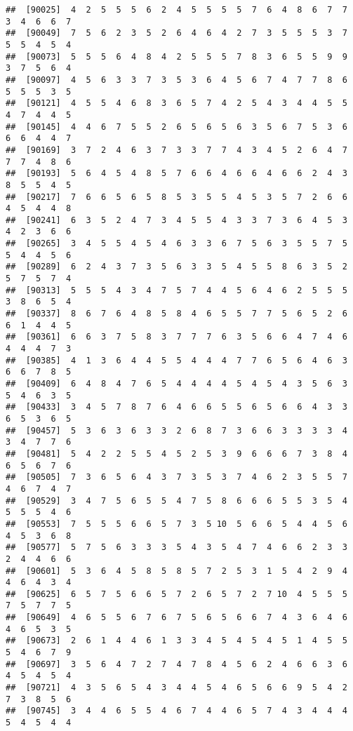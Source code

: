 \documentclass[
]{book}
\begin{document}
\begin{verbatim}
##  [90025]  4  2  5  5  5  6  2  4  5  5  5  5  7  6  4  8  6  7  7  3  4  6  6  7
##  [90049]  7  5  6  2  3  5  2  6  4  6  4  2  7  3  5  5  5  3  7  5  5  4  5  4
##  [90073]  5  5  5  6  4  8  4  2  5  5  5  7  8  3  6  5  5  9  9  3  7  5  6  4
##  [90097]  4  5  6  3  3  7  3  5  3  6  4  5  6  7  4  7  7  8  6  5  5  5  3  5
##  [90121]  4  5  5  4  6  8  3  6  5  7  4  2  5  4  3  4  4  5  5  4  7  4  4  5
##  [90145]  4  4  6  7  5  5  2  6  5  6  5  6  3  5  6  7  5  3  6  6  6  4  4  7
##  [90169]  3  7  2  4  6  3  7  3  3  7  7  4  3  4  5  2  6  4  7  7  7  4  8  6
##  [90193]  5  6  4  5  4  8  5  7  6  6  4  6  6  4  6  6  2  4  3  8  5  5  4  5
##  [90217]  7  6  6  5  6  5  8  5  3  5  5  4  5  3  5  7  2  6  6  4  5  4  4  8
##  [90241]  6  3  5  2  4  7  3  4  5  5  4  3  3  7  3  6  4  5  3  4  2  3  6  6
##  [90265]  3  4  5  5  4  5  4  6  3  3  6  7  5  6  3  5  5  7  5  5  4  4  5  6
##  [90289]  6  2  4  3  7  3  5  6  3  3  5  4  5  5  8  6  3  5  2  5  7  5  7  4
##  [90313]  5  5  5  4  3  4  7  5  7  4  4  5  6  4  6  2  5  5  5  3  8  6  5  4
##  [90337]  8  6  7  6  4  8  5  8  4  6  5  5  7  7  5  6  5  2  6  6  1  4  4  5
##  [90361]  6  6  3  7  5  8  3  7  7  7  6  3  5  6  6  4  7  4  6  4  4  4  7  3
##  [90385]  4  1  3  6  4  4  5  5  4  4  4  7  7  6  5  6  4  6  3  6  6  7  8  5
##  [90409]  6  4  8  4  7  6  5  4  4  4  4  5  4  5  4  3  5  6  3  5  4  6  3  5
##  [90433]  3  4  5  7  8  7  6  4  6  6  5  5  6  5  6  6  4  3  3  6  5  3  6  5
##  [90457]  5  3  6  3  6  3  3  2  6  8  7  3  6  6  3  3  3  3  4  3  4  7  7  6
##  [90481]  5  4  2  2  5  5  4  5  2  5  3  9  6  6  6  7  3  8  4  6  5  6  7  6
##  [90505]  7  3  6  5  6  4  3  7  3  5  3  7  4  6  2  3  5  5  7  4  6  7  4  7
##  [90529]  3  4  7  5  6  5  5  4  7  5  8  6  6  6  5  5  3  5  4  5  5  5  4  6
##  [90553]  7  5  5  5  6  6  5  7  3  5 10  5  6  6  5  4  4  5  6  4  5  3  6  8
##  [90577]  5  7  5  6  3  3  3  5  4  3  5  4  7  4  6  6  2  3  3  2  4  4  6  6
##  [90601]  5  3  6  4  5  8  5  8  5  7  2  5  3  1  5  4  2  9  4  4  6  4  3  4
##  [90625]  6  5  7  5  6  6  5  7  2  6  5  7  2  7 10  4  5  5  5  7  5  7  7  5
##  [90649]  4  6  5  5  6  7  6  7  5  6  5  6  6  7  4  3  6  4  6  4  6  5  3  5
##  [90673]  2  6  1  4  4  6  1  3  3  4  5  4  5  4  5  1  4  5  5  5  4  6  7  9
##  [90697]  3  5  6  4  7  2  7  4  7  8  4  5  6  2  4  6  6  3  6  4  5  4  5  4
##  [90721]  4  3  5  6  5  4  3  4  4  5  4  6  5  6  6  9  5  4  2  7  3  8  5  6
##  [90745]  3  4  4  6  5  5  4  6  7  4  4  6  5  7  4  3  4  4  4  5  4  5  4  4

\end{verbatim}
\end{document}
